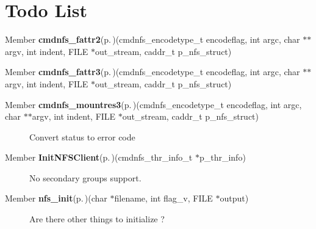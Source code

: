 \section{Todo List}\label{todo}
\label{todo__todo000002}
 \begin{description}
\item[Member {\bf cmdnfs\_\-fattr2}{\rm (p.\,\pageref{cmd__nfstools_8c_a69})}(cmdnfs\_\-encodetype\_\-t encodeflag, int argc, char $\ast$$\ast$argv, int indent, FILE $\ast$out\_\-stream, caddr\_\-t p\_\-nfs\_\-struct) ]

\end{description}


\label{todo__todo000003}
 \begin{description}
\item[Member {\bf cmdnfs\_\-fattr3}{\rm (p.\,\pageref{cmd__nfstools_8c_a82})}(cmdnfs\_\-encodetype\_\-t encodeflag, int argc, char $\ast$$\ast$argv, int indent, FILE $\ast$out\_\-stream, caddr\_\-t p\_\-nfs\_\-struct) ]

\end{description}


\label{todo__todo000001}
 \begin{description}
\item[Member {\bf cmdnfs\_\-mountres3}{\rm (p.\,\pageref{cmd__nfstools_8c_a67})}(cmdnfs\_\-encodetype\_\-t encodeflag, int argc, char $\ast$$\ast$argv, int indent, FILE $\ast$out\_\-stream, caddr\_\-t p\_\-nfs\_\-struct) ]Convert status to error code\end{description}


\label{todo__todo000004}
 \begin{description}
\item[Member {\bf Init\-NFSClient}{\rm (p.\,\pageref{commands__NFS_8c_a18})}(cmdnfs\_\-thr\_\-info\_\-t $\ast$p\_\-thr\_\-info) ]No secondary groups support.\end{description}


\label{todo__todo000005}
 \begin{description}
\item[Member {\bf nfs\_\-init}{\rm (p.\,\pageref{commands__NFS_8c_a21})}(char $\ast$filename, int flag\_\-v, FILE $\ast$output) ]Are there other things to initialize ?\end{description}

